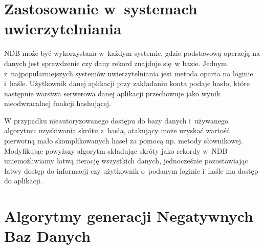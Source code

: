 \section{Zastosowanie w~systemach uwierzytelniania}
NDB może być wykorzystana w~każdym systemie, gdzie podstawową operacją na danych jest sprawdzenie czy
dany rekord znajduje się w bazie. Jednym z~najpopularniejszych systemów uwierzytelniania jest metoda oparta na loginie i~haśle.
Użytkownik danej aplikacji przy zakładaniu konta podaje hasło, które następnie warstwa serwerowa danej aplikacji przechowuje jako wynik nieodwracalnej funkcji hashującej.

W przypadku nieautoryzowanego dostępu do bazy danych i~używanego algorytmu uzyskiwania skrótu z~hasła, atakujący może uzyskać 
wartość pierwotną mało skomplikowanych haseł za pomocą np. metody słownikowej. Modyfikując powyższy algorytm 
składując skróty jako rekordy w~NDB uniemożliwiamy łatwą iterację wszystkich danych, jednocześnie pozostawiając
łatwy dostęp do informacji czy użytkownik o~podanym loginie i~haśle ma dostęp do aplikacji.

\section{Algorytmy generacji Negatywnych Baz Danych}
